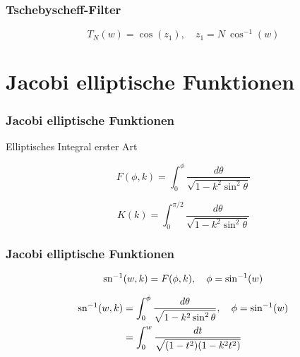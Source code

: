 \documentclass[ngerman, aspectratio=169, xcolor={rgb}]{beamer}
\begin{document}
	\begin{frame}
		\frametitle{Tschebyscheff-Filter}

		\begin{equation*}
			T_N(w) = \cos \left(z_1 \right), \quad z_1 = N~\cos^{-1}(w)
		\end{equation*}

		\begin{center}
			\scalebox{0.85}{
				
			}
		\end{center}

	\end{frame}


	\section{Jacobi elliptische Funktionen}

	\begin{frame}
		\frametitle{Jacobi elliptische Funktionen}

		Elliptisches Integral erster Art

		\begin{equation*}
			F(\phi, k)
			=
			\int_{0}^{\phi}
			\frac{
				d\theta
			}{
				\sqrt{
					1-k^2 \sin^2 \theta
				}
			}
		\end{equation*}

		\begin{equation*}
			K(k)
			=
			\int_{0}^{\pi / 2}
			\frac{
				d\theta
			}{
				\sqrt{
					1-k^2 \sin^2 \theta
				}
			}
		\end{equation*}



	\end{frame}





	\begin{frame}
		\frametitle{Jacobi elliptische Funktionen}

			\begin{equation*}
				\sn^{-1}(w, k)
				=
				F(\phi, k),
				\quad
				\phi = \sin^{-1}(w)
			\end{equation*}

			\begin{align*}
				\sn^{-1}(w, k)
					& =
				\int_{0}^{\phi}
				\frac{
					d\theta
				}{
					\sqrt{
						1-k^2 \sin^2 \theta
					}
				},
				\quad
				\phi = \sin^{-1}(w)
				\\
					& =
				\int_{0}^{w}
				\frac{
					dt
				}{
					\sqrt{
						(1-t^2)(1-k^2 t^2)
					}
				}
			\end{align*}



		\end{frame}
\end{document}
